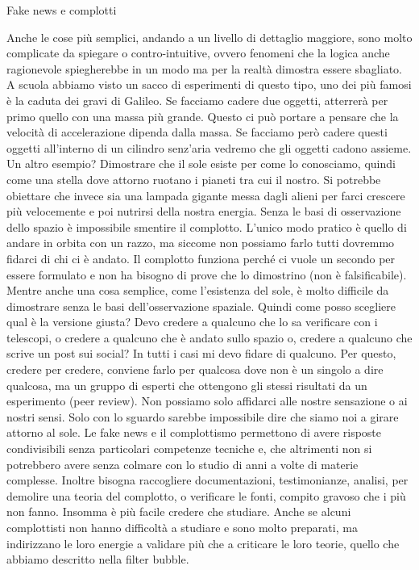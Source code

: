 \documentclass[12pt]{book} %
\begin{document}
\bigskip
\begin{mdframed}[linewidth=1pt]
Fake news e complotti

Anche le cose più semplici, andando a un livello di dettaglio maggiore, sono molto complicate da spiegare o
contro-intuitive, ovvero fenomeni che la logica anche ragionevole spiegherebbe in un modo ma per la realtà dimostra
essere sbagliato. A scuola abbiamo visto un sacco di esperimenti di questo tipo, uno dei più famosi è la caduta dei
gravi di Galileo. Se facciamo cadere due oggetti, atterrerà per primo quello con una massa più grande. Questo ci può
portare a pensare che la velocità di accelerazione dipenda dalla massa. Se facciamo però cadere questi oggetti
all'interno di un cilindro senz'aria vedremo che gli oggetti cadono assieme.
Un altro esempio? Dimostrare che il sole esiste per come lo conosciamo, quindi come una stella dove attorno ruotano i
pianeti tra cui il nostro. Si potrebbe obiettare che invece sia una lampada gigante messa dagli alieni per farci
crescere più velocemente e poi nutrirsi della nostra energia. Senza le basi di osservazione dello spazio è impossibile
smentire il complotto. L'unico modo pratico è quello di andare in orbita con un razzo, ma siccome non possiamo farlo
tutti dovremmo fidarci di chi ci è andato. Il complotto funziona perché ci vuole un secondo per essere formulato e non
ha bisogno di prove che lo dimostrino (non è falsificabile). Mentre anche una cosa semplice, come l'esistenza del sole,
è molto difficile da dimostrare senza le basi dell'osservazione spaziale. Quindi come posso scegliere qual è la
versione giusta? Devo credere a qualcuno che lo sa verificare con i telescopi, o credere a qualcuno che è andato sullo
spazio o, credere a qualcuno che scrive un post sui social? In tutti i casi mi devo fidare di qualcuno. Per questo,
credere per credere, conviene farlo per qualcosa dove non è un singolo a dire qualcosa, ma un gruppo di esperti che
ottengono gli stessi risultati da un esperimento (peer review). Non possiamo solo affidarci alle nostre sensazione o ai
nostri sensi. Solo con lo sguardo sarebbe impossibile dire che siamo noi a girare attorno al sole. Le fake news e il
complottismo permettono di avere risposte condivisibili senza particolari competenze tecniche e, che altrimenti non si
potrebbero avere senza colmare con lo studio di anni a volte di materie complesse. Inoltre bisogna raccogliere
documentazioni, testimonianze, analisi, per demolire una teoria del complotto, o verificare le fonti, compito gravoso
che i più non fanno. Insomma è più facile credere che studiare. Anche se alcuni complottisti non hanno difficoltà a
studiare e sono molto preparati, ma indirizzano le loro energie a validare più che a criticare le loro teorie, quello
che abbiamo descritto nella filter bubble.



\end{mdframed}
\end{document}
